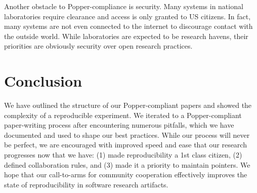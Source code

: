 Another obstacle to Popper-compliance is security. Many systems in national
laboratories require clearance and access is only granted to US citizens. In
fact, many systems are not even connected to the internet to discourage contact
with the outside world. While laboratories are expected to be research havens,
their priorities are obviously security over open research practices.

\section{Conclusion}

We have outlined the structure of our Popper-compliant papers and showed the
complexity of a reproducible experiment. We iterated to a Popper-compliant
paper-writing process after encountering numerous pitfalls, which we have
documented and used to shape our best practices. While our process will never
be perfect, we are encouraged with improved speed and ease that our research
progresses now that we have: (1) made reproducibility a 1st class citizen, (2)
defined collaboration rules, and (3) made it a priority to maintain pointers.
We hope that our call-to-arms for community cooperation effectively improves
the state of reproducibility in software research artifacts.
